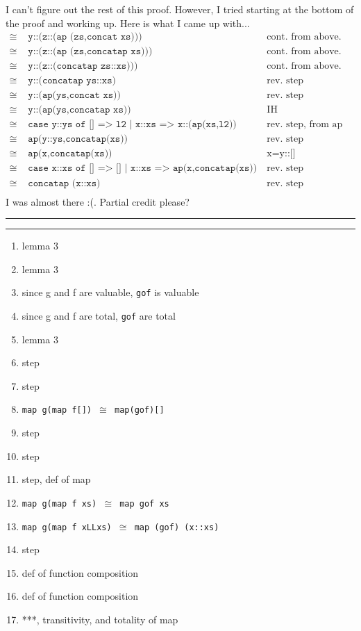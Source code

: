\documentclass[11pt,letterpaper]{article}
\newcommand{\question}[2] {\vspace{.25in} \hrule\vspace{0.5em}
\noindent{\bf #1: #2} \vspace{0.5em}
\hrule \vspace{.10in}}
\begin{document}
I can't figure out the rest of this proof.
However, I tried starting at the bottom of the proof and working up. Here is 
what I came up with...
\begin{align*}
\cong & \texttt{ y::(z::(ap (zs,concat xs)))} & \text{cont. from above.}\\
\cong & \texttt{ y::(z::(ap (zs,concatap xs)))} & \text{cont. from above.}\\
\cong & \texttt{ y::(z::(concatap zs::xs)))} & \text{cont. from above.}\\
\cong & \texttt{ y::(concatap ys::xs)} & \text{rev. step}\\
\cong & \texttt{ y::(ap(ys,concat xs))} & \text{rev. step}\\
\cong & \texttt{ y::(ap(ys,concatap xs))} & \text{IH}\\
\cong & \texttt{ case y::ys of [] => l2 | x::xs => x::(ap(xs,l2))} & \text{rev. step, from ap}\\
\cong & \texttt{ ap(y::ys,concatap(xs))} & \text{rev. step}\\
\cong & \texttt{ ap(x,concatap(xs)) } & \text{x=y::[]}\\
\cong & \texttt{ case x::xs of [] => [] | x::xs => ap(x,concatap(xs)) } & \text{rev. step (concatap)}\\
\cong & \texttt{ concatap (x::xs) } & \text{rev. step}\\
\end{align*}
I was almost there :(. Partial credit please?


\question{3}{Task 2.4}

\begin{enumerate}
\item lemma 3
\item lemma 3
\item since g and f are valuable, \texttt{gof} is valuable
\item since g and f are total, \texttt{gof} are total
\item lemma 3
\item step
\item step
\item \texttt{map g(map f[]) $\cong$ map(gof)[]}
\item step
\item step
\item step, def of map
\item \texttt{map g(map f xs) $\cong$ map gof xs}
\item \texttt{map g(map f xLLxs) $\cong$ map (gof) (x::xs)}
\item step
\item def of function composition
\item def of function composition
\item ***, transitivity, and totality of map
\end{enumerate}
\end{document}
